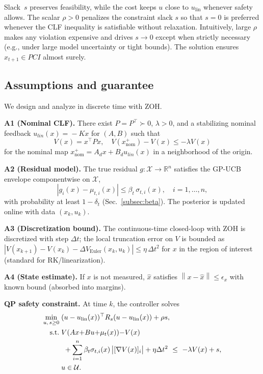 \documentclass[10pt]{article}
\newcommand{\R}{\mathbb{R}}
\newcommand{\Xset}{\mathcal{X}}
\newcommand{\Vdec}{\lambda}       %
\newcommand{\sig}{\sigma}
\newcommand{\mumu}{\mu}
\newcommand{\norm}[1]{\left\lVert #1 \right\rVert}
\newcommand{\1}{\mathbbm{1}}
\begin{document}
Slack~$s$ preserves feasibility, while the cost keeps $u$ close to $u_{\mathrm{lin}}$ whenever safety allows.
The scalar $\rho>0$ penalizes the constraint slack $s$ so that $s=0$ is preferred whenever the CLF inequality is satisfiable without relaxation. Intuitively, large $\rho$ makes any violation expensive and drives $s\!\to\!0$ except when strictly necessary (e.g., under large model uncertainty or tight bounds). The solution ensures $x_{t+1}\in PCI$ almost surely.


\subsection{Assumptions and guarantee}\label{subsec:guarantee}
We design and analyze in discrete time with ZOH.

\textbf{A1 (Nominal CLF).} There exist $P\!=\!P^\top\!\succ 0$, $\Vdec\!>\!0$, and a stabilizing nominal feedback $u_{lin}(x)\!=\!-Kx$ for $(A,B)$ such that 
\[
V(x)=x^\top P x,\quad V(x^+_{\text{nom}})-V(x)\le -\Vdec V(x)
\]
for the nominal map $x^+_{\text{nom}}=A_dx+B_du_{lin}(x)$ in a neighborhood of the origin.

\textbf{A2 (Residual model).} The true residual $g:\Xset\to\R^n$ satisfies the GP-UCB envelope componentwise on $\Xset$,
\[
|g_i(x)-\mumu_{t,i}(x)| \le \beta_t\, \sig_{t,i}(x),\quad i=1,\dots,n,
\]
with probability at least $1-\delta_t$ (Sec.~\ref{subsec:beta}). The posterior is updated online with data $(x_k,u_k)$.

\textbf{A3 (Discretization bound).} The continuous-time closed-loop with ZOH is discretized with step $\Delta t$; the local truncation error on $V$ is bounded as
\(
|V(x_{k+1})-V(x_k)-\Delta V_{\text{Euler}}(x_k,u_k)| \le \eta\,\Delta t^2
\)
for $x$ in the region of interest (standard for RK/linearization).

\textbf{A4 (State estimate).} If $x$ is not measured, $\hat x$ satisfies $\norm{x-\hat x}\le \epsilon_x$ with known bound (absorbed into margins).

\medskip

\textbf{QP safety constraint.} At time $k$, the controller solves
\begin{subequations}\label{eq:pcis_constraint}
\begin{align}
\min_{u,\,s\ge0}\;&(u-u_{\text{lin}}(x))^\top R_s (u-u_{\text{lin}}(x))+\rho s,\\
\text{s.t.}\;&V(Ax{+}Bu{+}\mu_t(x)){-}V(x)\notag\\
&\ +\sum_{i=1}^n \beta_t \sigma_{t,i}(x)\,\bigl|[\nabla V(x)]_i\bigr|
+\eta \Delta t^{2}\ \le\ -\Vdec V(x)+s,\\
&u\in\mathcal U.
\end{align}
\end{subequations}
\end{document}
